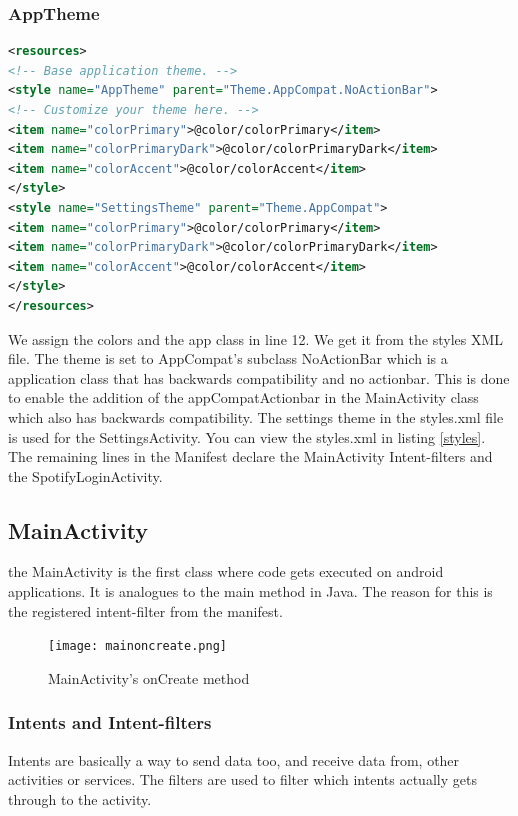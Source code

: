 \subsubsection{AppTheme}
\begin{lstlisting}[language=XML, caption={styles.xml},label={styles}]
<resources>
<!-- Base application theme. -->
<style name="AppTheme" parent="Theme.AppCompat.NoActionBar">
<!-- Customize your theme here. -->
<item name="colorPrimary">@color/colorPrimary</item>
<item name="colorPrimaryDark">@color/colorPrimaryDark</item>
<item name="colorAccent">@color/colorAccent</item>
</style>
<style name="SettingsTheme" parent="Theme.AppCompat">
<item name="colorPrimary">@color/colorPrimary</item>
<item name="colorPrimaryDark">@color/colorPrimaryDark</item>
<item name="colorAccent">@color/colorAccent</item>
</style>
</resources>
\end{lstlisting}
We assign the colors and the app class in line 12. We get it from the styles XML file. The theme is set to AppCompat's subclass NoActionBar which is a application class that has backwards compatibility and no actionbar. This is done to enable the addition of the appCompatActionbar in the MainActivity class which also has backwards compatibility. The settings theme in the styles.xml file is used for the SettingsActivity. You can view the styles.xml in listing \ref{styles}. The remaining lines in the Manifest declare the MainActivity Intent-filters and the SpotifyLoginActivity. 

\subsection{MainActivity \label{mainactivity}}
the MainActivity is the first class where code gets executed on android applications. It is analogues to the main method in Java. The reason for this is the registered intent-filter from the manifest.
\begin{figure}[!htb]
	\centering
	\texttt{[image: mainoncreate.png]}
	\caption{MainActivity's onCreate method \label{mainoncreate} }
\end{figure}

\subsubsection{Intents and Intent-filters}
Intents are basically a way to send data too, and receive data from, other activities or services. The filters are used to filter which intents actually gets through to the activity\cite{intent}.

